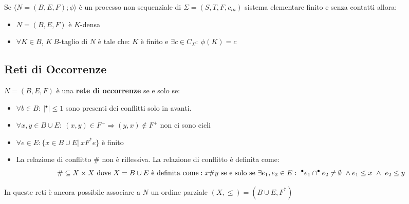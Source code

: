 Se $\langle N = (B, E, F); \phi \rangle$ è un processo non sequenziale di $\Sigma = (S, T, F, c_{in})$ sistema elementare finito e senza contatti allora:
\begin{itemize}
    \item $N = (B, E, F)$ è $K$-densa
    \item $\forall K \in B$, $K\ B$-taglio di $N$ è tale che: $K$ è finito e $\exists c \in C_{\Sigma}: \ \phi(K) = c$ 
\end{itemize}
\subsection{Reti di Occorrenze}
\begin{definizione}
    $N = (B, E, F)$ è una \textbf{rete di occorrenze} se e solo se:
    \begin{itemize}
        \item $\forall b \in B: \ | ^{\bullet}| \leq 1$ sono presenti dei conflitti solo in avanti.
        \item $\forall x, y \in B \cup E: \ (x, y) \in F^{+} \Rightarrow (y, x) \notin F^{+}$ non ci sono cicli
        \item $\forall e \in E: \{x \in B \cup E| \ xF^{\ast} e \}$ è finito
        \item La relazione di conflitto $\#$ non è riflessiva. La relazione di conflitto è definita come: 
        \begin{equation}
            \# \subseteq X \times X \ \text{dove} \ X = B \cup E \ \text{è definita come}: \\
            x\#y \ \text{se e solo se} \ \exists e_1, e_2 \in E: \ ^{\bullet} e_1 \cap ^{\bullet} e_2 \neq \emptyset \ \land e_1 \leq x \ \land \ e_2 \leq y
        \end{equation}
    \end{itemize}
\end{definizione}
In queste reti è ancora possibile associare a $N$ un ordine parziale $(X, \leq) = (B \cup E, F^{\ast})$
